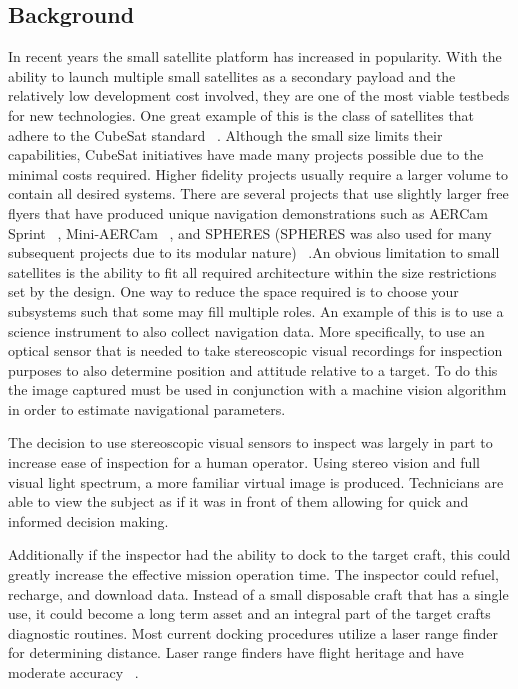 \documentclass[journal, 10pt]{IEEEtran}
\begin{document}
\subsection{Background}
In recent years the small satellite platform has increased in popularity. With the ability to launch multiple small satellites as a secondary payload and the relatively low development cost involved, they are one of the most viable testbeds for new technologies.  One great example of this is the class of satellites that adhere to the CubeSat standard ~\cite{CubeSat}.  Although the small size limits their capabilities, CubeSat initiatives have made many projects possible due to the minimal costs required.  Higher fidelity projects usually require a larger volume to contain all desired systems.  There are several projects that use slightly larger free flyers that have produced unique navigation demonstrations such as AERCam Sprint ~\cite{Aercam}, Mini-AERCam ~\cite{MiniAercam}, and SPHERES (SPHERES was also used for many subsequent projects due to its modular nature) ~\cite{SPHERES}.An obvious limitation to small satellites is the ability to fit all required architecture within the size restrictions set by the design.  One way to reduce the space required is to choose your subsystems such that some may fill multiple roles.  An example of this is to use a science instrument to also collect navigation data.  More specifically, to use an optical sensor that is needed to take stereoscopic visual recordings for inspection purposes to also determine position and attitude relative to a target.  To do this the image captured must be used in conjunction with a machine vision algorithm in order to estimate navigational parameters.

The decision to use stereoscopic visual sensors to inspect was largely in part to increase ease of inspection for a human operator.  Using stereo vision and full visual light spectrum, a more familiar virtual image is produced.  Technicians are able to view the subject as if it was in front of them allowing for quick and informed decision making.

Additionally if the inspector had the ability to dock to the target craft, this could greatly increase the effective mission operation time.  The inspector could refuel, recharge, and download data.  Instead of a small disposable craft that has a single use, it could become a long term asset and an integral part of the target crafts diagnostic routines.  Most current docking procedures utilize a laser range finder for determining distance.  Laser range finders have flight heritage and have moderate accuracy ~\cite{Docking}.
\end{document}
